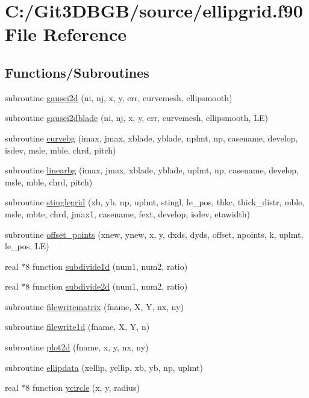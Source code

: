 \hypertarget{ellipgrid_8f90}{}\section{C\+:/\+Git3\+D\+B\+G\+B/source/ellipgrid.f90 File Reference}
\label{ellipgrid_8f90}
\subsection*{Functions/\+Subroutines}
\begin{DoxyCompactItemize}
\item 
subroutine \hyperlink{ellipgrid_8f90_ad37e0a5511289684f99d62342ff71a68}{gausei2d} (ni, nj, x, y, err, curvemesh, ellipsmooth)
\item 
subroutine \hyperlink{ellipgrid_8f90_a9700874d36140d2c7bee117590d5dae9}{gausei2dblade} (ni, nj, x, y, err, curvemesh, ellipsmooth, L\+E)
\item 
subroutine \hyperlink{ellipgrid_8f90_adefdbbd93b3c42f5c88bf066fffda020}{curvebg} (imax, jmax, xblade, yblade,                                                                               uplmt, np, casename, develop, isdev, msle, mble, chrd, pitch)
\item 
subroutine \hyperlink{ellipgrid_8f90_a23f0130faf07695ae0633d37888c9298}{linearbg} (imax, jmax, xblade, yblade,                                               uplmt, np, casename, develop, msle, mble, chrd, pitch)
\item 
subroutine \hyperlink{ellipgrid_8f90_ae47ef85c421748bee190d8cffa59a6cf}{stinglegrid} (xb, yb, np, uplmt, stingl, le\+\_\+pos, thkc, thick\+\_\+distr,                                                                                       mble, msle, mbte, chrd, jmax1, casename, fext, develop, isdev, etawidth)
\item 
subroutine \hyperlink{ellipgrid_8f90_a341cb8880e0207c9fc41bc535fb8eb89}{offset\+\_\+points} (xnew, ynew, x, y, dxds, dyds, offset, npoints, k, uplmt, le\+\_\+pos, L\+E)
\item 
real $\ast$8 function \hyperlink{ellipgrid_8f90_aacf8b315a6f9a55076d90c6548dfe96c}{subdivide1d} (num1, num2, ratio)
\item 
real $\ast$8 function \hyperlink{ellipgrid_8f90_a42a928bec1247db70e46f617b4d7e0d3}{subdivide2d} (num1, num2, ratio)
\item 
subroutine \hyperlink{ellipgrid_8f90_a8c55d5a92c70a34a496062137ef35f6e}{filewritematrix} (fname, X, Y, nx, ny)
\item 
subroutine \hyperlink{ellipgrid_8f90_ac17e07f3b5ce7de5506c807ae6db88ef}{filewrite1d} (fname, X, Y, n)
\item 
subroutine \hyperlink{ellipgrid_8f90_a812686a74c0d9667fd05b52300908671}{plot2d} (fname, x, y, nx, ny)
\item 
subroutine \hyperlink{ellipgrid_8f90_acd54e32b03fd291e8ff39a8130d18f5c}{ellipdata} (xellip, yellip, xb, yb, np, uplmt)
\item 
real $\ast$8 function \hyperlink{ellipgrid_8f90_a3f325469fb90d800dfdbcc323ffbd45d}{ycircle} (x, y, radius)
\end{DoxyCompactItemize}


